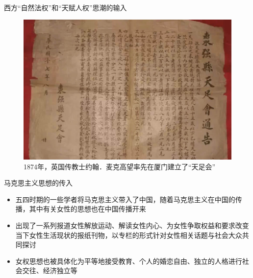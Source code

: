 \begin{frame}{西方“自然法权”和“天赋人权”思潮的输入}
    \begin{figure}
        \centering
        \includegraphics[height=.63\textheight]{../docs/img/1-4.jpg}
        \caption{1874年，英国传教士约翰．麦克高望率先在厦门建立了“天足会”}
    \end{figure}
\end{frame}

\begin{frame}{马克思主义思想的传入}
    \begin{block}{}
        \begin{itemize}
            \item 五四时期的一些学者将马克思主义带入了中国，随着马克思主义在中国的传播，其中有关女性的思想也在中国传播开来
            \item 出现了一系列报道女性解放运动、解读女性内心、为女性争取权益和要求改变当下女性生活现状的报纸刊物，以专栏的形式针对女性相关话题与社会大众共同探讨
            \item 女权思想也被具体化为平等地接受教育、个人的婚恋自由、独立的人格进行社会交往、经济独立等
        \end{itemize}
    \end{block}
\end{frame}


